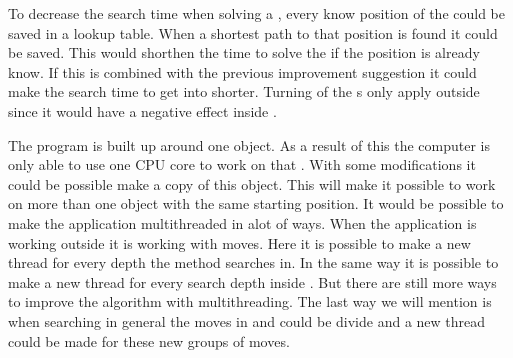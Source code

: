 To decrease the search time when solving a \rubik{}, every know position of the \rubik{} could be saved in a lookup table.
When a shortest path to that position is found it could be saved.
This would shorthen the time to solve the \rubik{} if the position is already know.
If this is combined with the previous improvement suggestion it could make the search time to get into  shorter.
Turning of the \face{}s only apply outside  since it would have a negative effect inside . 
	 
The program is built up around one \cube{} object.
As a result of this the computer is only able to use one CPU core to work on that \cube{}.
With some modifications it could be possible make a copy of this \cube{} object.
This will make it possible to work on more than one \cube{} object with the same starting position.
It would be possible to make the application multithreaded in alot of ways.
When the application is working outside  it is working with  moves.
Here it is possible to make a new thread for every depth the method searches in.
In the same way it is possible to make a new thread for every search depth inside .
But there are still more ways to improve the algorithm with multithreading.
The last way we will mention is when searching in general the moves in  and  could be divide and a new thread could be made for these new groups of moves.